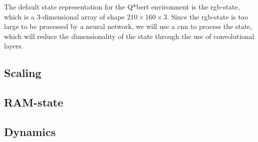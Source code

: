 The default state representation for the Q*bert environment is the
\gls{rgb}-state, which is a 3-dimensional array of shape $210 \times 160 \times
3$. Since the \gls{rgb}-state is too large to be processed by a neural network,
we will use a \gls{cnn} to process the state, which will reduce the
dimensionality of the state through the use of convolutional layers.

\subsection{Scaling}\label{sec:environment-state-representation-scaling}


\subsection{RAM-state}\label{sec:environment-state-representation-ram-state}


\subsection{Dynamics}\label{sec:environment-state-representation-dynamics}
